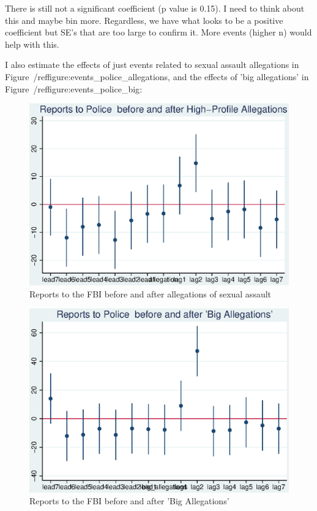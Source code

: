 \documentclass[AER,draftmode]{AEA}
\begin{document}
There is still not a significant coefficient (p value is 0.15). I need to think about this and maybe bin more. Regardless, we have what looks to be a positive coefficient but SE's that are too large to confirm it. More events (higher n) would help with this.

I also estimate the effects of just events related to sexual assault allegations in Figure~/ref{figure:events_police_allegations}, and the effects of 'big allegations' in Figure~/ref{figure:events_police_big}:

\begin{figure}
\includegraphics[]{figures/events_police_allegations.eps}
\caption{Reports to the FBI before and after allegations of sexual assault} \label{figure:events_police_allegations}
\end{figure}

\begin{figure}
\includegraphics[]{figures/events_police_big.eps}
\caption{Reports to the FBI before and after 'Big Allegations'} \label{figure:events_police_big}
\end{figure}
\end{document}
